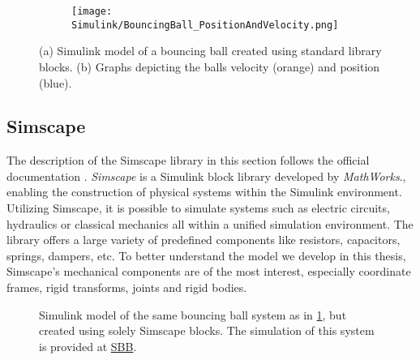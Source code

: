 \begin{figure}[h!]
	\begin{subfigure}{.5\textwidth} %
		\centering
		\caption{}
		\label{figure: Simulink bouncing ball model}
	\end{subfigure}
	\begin{subfigure}{.5\textwidth}
		\centering
		\texttt{[image: Simulink/BouncingBall\_PositionAndVelocity.png]}  
		\caption{}
		\label{figure: Simulink bouncing ball graphs}
	\end{subfigure}
	\caption[Simulink bouncing ball example]{(a) Simulink model of a bouncing ball created using standard library blocks. (b) Graphs depicting the balls velocity (orange) and position (blue).}
	\label{figure: Simulink bouncing ball example}
\end{figure}


\subsection{Simscape}
The description of the Simscape library in this section follows the official documentation \parencite{matlabSimscapeDocumentation}.
\textit{Simscape\textsuperscript{\texttrademark}} is a Simulink block library developed by \textit{MathWorks\textsuperscript{\textregistered}}., enabling the construction of physical systems within the Simulink environment.
Utilizing Simscape, it is possible to simulate systems such as electric circuits, hydraulics or classical mechanics all within a unified simulation environment.
The library offers a large variety of predefined components like resistors, capacitors, springs, dampers, etc.
To better understand the model we develop in this thesis, Simscape's mechanical components are of the most interest, especially coordinate frames, rigid transforms, joints and rigid bodies.

\begin{figure}[h!]
	\centering
	\centerline{}
	\caption[Simscape bouncing ball example]{Simulink model of the same bouncing ball system as in \ref{figure: Simulink bouncing ball model}, but created using solely Simscape blocks. The simulation of this system is provided at \hyperref[vid: Simscape]{SBB}.} 
	\label{figure: Simscape Bouncing Ball Example}
\end{figure}

